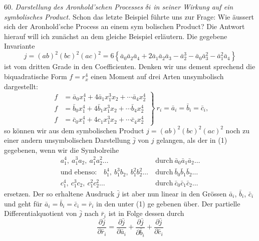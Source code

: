 \documentclass[11pt]{article}
\begin{document}
60. \textit{Darstellung des Aronhold'schen Processes $\delta i$ in seiner Wirkung
auf ein symbolisches Product.} Schon das letzte Beispiel führte uns zur
Frage: Wie äussert sich der Aronhold'sche Process an einem sym\-
bolischen Product? Die Antwort hierauf will ich zunächst an dem
gleiche Beispiel erläutern. Die gegebene Invariante
\[
j = (ab)^2(bc)^2(ac)^2 = 6\left\{\bar a_0\bar a_2\bar a_4+2\bar a_1\bar a_2\bar a_3-\bar a_2^3-\bar a_0\bar a_3^2-\bar a_1^2\bar a_4\right\} \tag{1}
\]
ist vom dritten Grade in den Coefficienten. Denken wir uns dement\-
sprechend die biquadratische Form $f=r_x^4$ einen Moment auf drei Arten
unsymbolisch dargestellt:
\[
\left.
\begin{aligned}
f &= \bar a_0 x_1^4+4\bar a_1 x_1^3x_2+\cdots \bar a_4 x_2^4\\
f &= \bar b_0 x_1^4+4\bar b_1 x_1^3x_2+\cdots \bar b_4 x_2^4\\
f &= \bar c_0 x_1^4+4c_1 x_1^3x_2+\cdots \bar c_4 x_2^4
\end{aligned}
\right\}\ r_i = \bar a_i = \bar b_i = \bar c_i,
\]
so können wir aus dem symbolischen Product $j=(ab)^2(bc)^2(ac)^2$ noch
zu einer andern unsymbolischen Darstellung $\bar j$ von $j$ gelangen, als der
in (1) gegebenen, wenn wir die Symbolreihe
\[
\begin{aligned}
a_1^4,\ a_1^3a_2,\ a_1^2a_2^2\ldots &\ \text{durch}\ \bar a_0\bar a_1\bar a_2\ldots\\
\text{und ebenso:}\quad b_1^4,\ b_1^3b_2,\ b_1^2b_2^2\ldots &\ \text{durch}\ \bar b_0\bar b_1\bar b_2\ldots\\
c_1^4,\ c_1^3c_2,\ c_1^2c_2^2\ldots &\ \text{durch}\ \bar c_0\bar c_1\bar c_2\ldots
\end{aligned}
\]
ersetzen. Der so erhaltene Ausdruck $\bar j$ ist aber nun linear in den
Grössen $\bar a_i$, $\bar b_i$, $\bar c_i$ und geht für $\bar a_i=\bar b_i=\bar c_i=\bar r_i$ in den unter (1) ge\-
gebenen über. Der partielle Differentialquotient von $\bar j$ nach $\bar r_i$ ist in
Folge dessen durch
\[
\frac{\partial\bar j}{\partial\bar r_i} = \frac{\partial\bar j}{\partial\bar a_i} + \frac{\partial\bar j}{\partial\bar b_i} + \frac{\partial\bar j}{\partial\bar c_i} \tag{2}
\]
\end{document}
